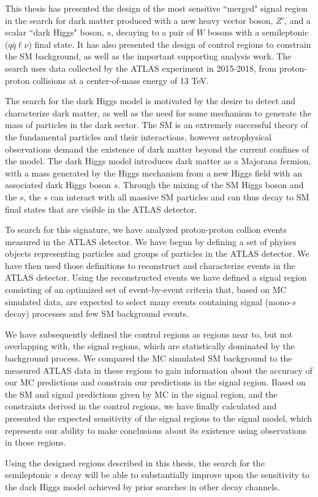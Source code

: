 \label{concl}
This thesis has presented the design of the most sensitive ``merged" signal region in the search for dark matter produced with a new heavy vector boson, $Z'$, and a scalar ``dark Higgs" boson, $s$, decaying to a pair of $W$ bosons with a semileptonic ($q\bar{q}\ell\nu$) final state. It has also presented the design of control regions to constrain the \ttbar SM background, as well as the important supporting analysis work.  The search uses data collected by the ATLAS experiment in 2015-2018, from proton-proton collisions at a center-of-mass energy of 13 TeV.

The search for the dark Higgs model \cite{Hunting} is motivated by the desire to detect and characterize dark matter, as well as the need for some mechanism to generate the mass of particles in the dark sector. The SM is an extremely successful theory of the fundamental particles and their interactions, however astrophysical observations demand the existence of dark matter beyond the current confines of the model. The dark Higgs model introduces dark matter as a Majorana fermion, with a mass generated by the Higgs mechanism from a new Higgs field with an associated dark Higgs boson $s$. Through the mixing of the SM Higgs boson and the $s$, the $s$ can interact with all massive SM particles and can thus decay to SM final states that are visible in the ATLAS detector.

To search for this signature, we have analyzed proton-proton collion events measured in the ATLAS detector. We have begun by defining a set of phyiscs objects representing particles and groups of particles in the ATLAS detector. We have then used those definitions to reconstruct and characterize events in the ATLAS detector. Using the reconstructed events we have defined a signal region consisting of an optimized set of event-by-event criteria that, based on MC simulated data, are expected to select many events containing signal (mono-$s$ decay) processes and few SM background events.

We have subsequently defined the control regions as regions near to, but not overlapping with, the signal regions, which are statistically dominated by the \ttbar background process. We compared the MC simulated SM background to the measured ATLAS data in these regions to gain information about the accuracy of our MC predictions and constrain our predictions in the signal region. Based on the SM and signal predictions given by MC in the signal region, and the constraints derived in the control regions, we have finally calculated and presented the expected sensitivity of the signal regions to the signal model, which represents our ability to make conclusions about its existence using observations in those regions.

Using the designed regions described in this thesis, the search for the semileptonic $s$ decay will be able to substantially improve upon the sensitivity to the dark Higgs model achieved by prior searches in other decay channels.
